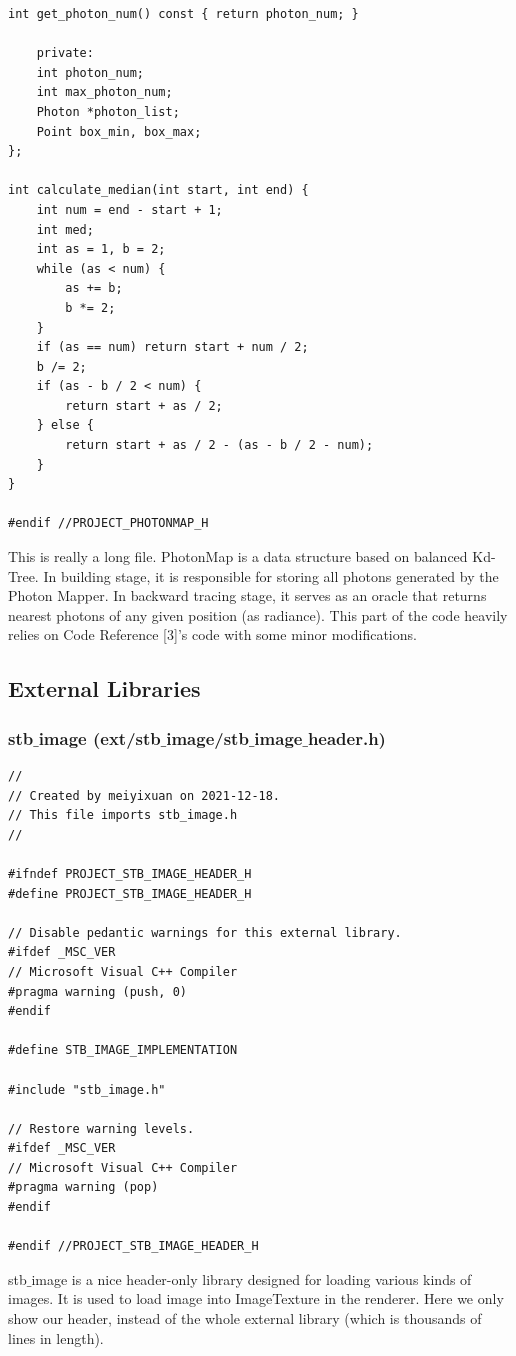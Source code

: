 \documentclass[utf8]{article}
\begin{document}
\begin{lstlisting}[style=CStyle]
	int get_photon_num() const { return photon_num; }
	
	private:
	int photon_num;
	int max_photon_num;
	Photon *photon_list;
	Point box_min, box_max;
};

int calculate_median(int start, int end) {
	int num = end - start + 1;
	int med;
	int as = 1, b = 2;
	while (as < num) {
		as += b;
		b *= 2;
	}
	if (as == num) return start + num / 2;
	b /= 2;
	if (as - b / 2 < num) {
		return start + as / 2;
	} else {
		return start + as / 2 - (as - b / 2 - num);
	}
}

#endif //PROJECT_PHOTONMAP_H

\end{lstlisting}
This is really a long file. PhotonMap is a data structure based on balanced Kd-Tree. In building stage, it is responsible for storing all photons generated by the Photon Mapper. In backward tracing stage, it serves as an oracle that returns nearest photons of any given position (as radiance). This part of the code heavily relies on Code Reference [3]'s code with some minor modifications.

\subsection{External Libraries}

\subsubsection{stb$\_$image (ext/stb$\_$image/stb$\_$image$\_$header.h)}
\begin{lstlisting}[style=CStyle]
//
// Created by meiyixuan on 2021-12-18.
// This file imports stb_image.h
//

#ifndef PROJECT_STB_IMAGE_HEADER_H
#define PROJECT_STB_IMAGE_HEADER_H

// Disable pedantic warnings for this external library.
#ifdef _MSC_VER
// Microsoft Visual C++ Compiler
#pragma warning (push, 0)
#endif

#define STB_IMAGE_IMPLEMENTATION

#include "stb_image.h"

// Restore warning levels.
#ifdef _MSC_VER
// Microsoft Visual C++ Compiler
#pragma warning (pop)
#endif

#endif //PROJECT_STB_IMAGE_HEADER_H

\end{lstlisting}
stb$\_$image is a nice header-only library designed for loading various kinds of images. It is used to load image into ImageTexture in the renderer. Here we only show our header, instead of the whole external library (which is thousands of lines in length).
\end{document}
